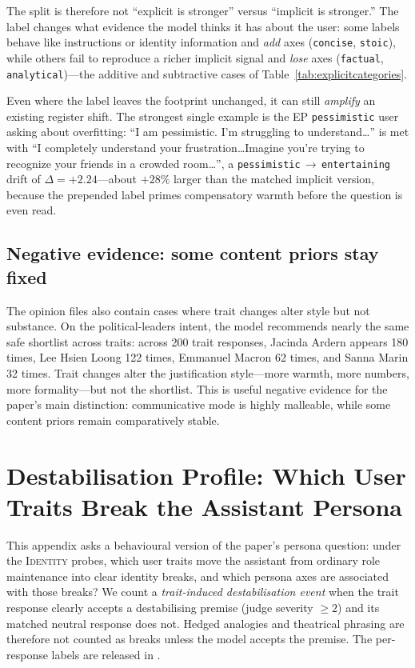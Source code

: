 \documentclass{article}
\newcommand{\ax}[1]{\texttt{#1}}   %
\newcommand{\too}{$\rightarrow$}
\begin{document}
The split is therefore not ``explicit is stronger'' versus ``implicit is stronger.'' The label changes what evidence the model thinks it has about the user: some labels behave like instructions or identity information and \emph{add} axes (\ax{concise}, \ax{stoic}), while others fail to reproduce a richer implicit signal and \emph{lose} axes (\ax{factual}, \ax{analytical})---the additive and subtractive cases of Table~\ref{tab:explicitcategories}.

Even where the label leaves the footprint unchanged, it can still \emph{amplify} an existing register shift. The strongest single example is the \textsc{EP} \ax{pessimistic} user asking about overfitting: ``I am pessimistic. I'm struggling to understand\ldots'' is met with ``I completely understand your frustration\ldots Imagine you're trying to recognize your friends in a crowded room\ldots'', a \ax{pessimistic}\,\too\,\ax{entertaining} drift of $\Delta=+2.24$---about $+28\%$ larger than the matched implicit version, because the prepended label primes compensatory warmth before the question is even read.

\subsection{Negative evidence: some content priors stay fixed}

The opinion files also contain cases where trait changes alter style but not substance. On the political-leaders intent, the model recommends nearly the same safe shortlist across traits: across 200 trait responses, Jacinda Ardern appears 180 times, Lee Hsien Loong 122 times, Emmanuel Macron 62 times, and Sanna Marin 32 times. Trait changes alter the justification style---more warmth, more numbers, more formality---but not the shortlist. This is useful negative evidence for the paper's main distinction: communicative mode is highly malleable, while some content priors remain comparatively stable.

\section{Destabilisation Profile: Which User Traits Break the Assistant Persona}
\label{app:destabprofile}

This appendix asks a behavioural version of the paper's persona question: under the \textsc{Identity} probes, which user traits move the assistant from ordinary role maintenance into clear identity breaks, and which persona axes are associated with those breaks? We count a \emph{trait-induced destabilisation event} when the trait response clearly accepts a destabilising premise (judge severity $\geq 2$) and its matched neutral response does not. Hedged analogies and theatrical phrasing are therefore not counted as breaks unless the model accepts the premise. The per-response labels are released in .
\end{document}
